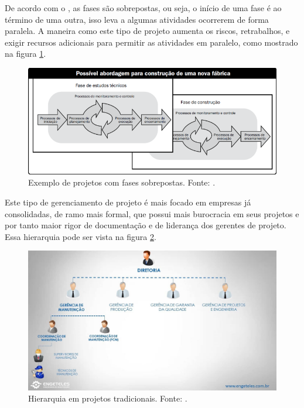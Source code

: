De acordo com o \cite{pmbok}, as fases são sobrepostas, ou seja, o início de uma fase é ao término de uma outra, isso leva a algumas atividades ocorrerem de forma paralela. A maneira como este tipo de projeto aumenta os riscos, retrabalhos, e exigir recursos adicionais para permitir as atividades em paralelo, como mostrado na figura \ref{img:fases_sobrepostas}.

\begin{figure}[H]
	\centering
	\includegraphics[width=1.0\textwidth]{figuras/fases_sobrepostas.png}
	\caption{Exemplo de projetos com fases sobrepostas. Fonte: \cite{pmbok}.}
	\label{img:fases_sobrepostas}
\end{figure}

Este tipo de gerenciamento de projeto é mais focado em empresas já consolidadas, de ramo mais formal, que possui mais burocracia em seus projetos e por tanto maior rigor de documentação e de liderança dos gerentes de projeto. Essa hierarquia pode ser vista na figura \ref{img:gerencia_de_projetos_tradicional}.

\begin{figure}[H]
	\centering
	\includegraphics[width=1.0\textwidth]{figuras/gerencia_de_projeto.jpg}
	\caption{Hierarquia em projetos tradicionais. Fonte: \cite{gerentes_tradicionais}.}
	\label{img:gerencia_de_projetos_tradicional}
\end{figure}

